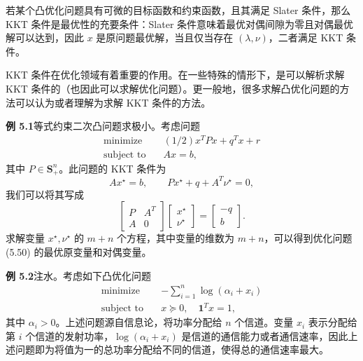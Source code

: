 \documentclass[UTF8, 12pt, fontset=fandol, oneside]{ctexart}
\begin{document}
若某个凸优化问题具有可微的目标函数和约束函数，且其满足 Slater 条件，那么 KKT 条件是最优性的充要条件：Slater 条件意味着最优对偶间隙为零且对偶最优解可以达到，因此 $x$ 是原问题最优解，当且仅当存在 $(\lambda,\nu)$，二者满足 KKT 条件。

KKT 条件在优化领域有着重要的作用。在一些特殊的情形下，是可以解析求解 KKT 条件的（也因此可以求解优化问题）。更一般地，很多求解凸优化问题的方法可以认为或者理解为求解 KKT 条件的方法。

\noindent\textbf{例 5.1}\quad 等式约束二次凸问题求极小。考虑问题
\begin{equation}
\begin{aligned}
\text{minimize}\quad & (1/2)x^TPx+q^Tx+r\\
\text{subject to}\quad & Ax=b,
\end{aligned}
\tag{5.50}
\end{equation}
其中 $P\in\mathbf{S}_+^n$。此问题的 KKT 条件为
\[
Ax^\star=b,\qquad Px^\star+q+A^T\nu^\star=0,
\]
我们可以将其写成
\[
\begin{bmatrix}
P & A^T\\
A & 0
\end{bmatrix}
\begin{bmatrix}
x^\star\\
\nu^\star
\end{bmatrix}
=
\begin{bmatrix}
-q\\
b
\end{bmatrix}.
\]
求解变量 $x^\star,\nu^\star$ 的 $m+n$ 个方程，其中变量的维数为 $m+n$，可以得到优化问题 (5.50) 的最优原变量和对偶变量。

\noindent\textbf{例 5.2}\quad 注水。考虑如下凸优化问题
\[
\begin{aligned}
\text{minimize}\quad & -\sum_{i=1}^n\log(\alpha_i+x_i)\\
\text{subject to}\quad & x\succeq 0,\quad \mathbf{1}^Tx=1,
\end{aligned}
\]
其中 $\alpha_i>0$。上述问题源自信息论，将功率分配给 $n$ 个信道。变量 $x_i$ 表示分配给第 $i$ 个信道的发射功率，$\log(\alpha_i+x_i)$ 是信道的通信能力或者通信速率，因此上述问题即为将值为一的总功率分配给不同的信道，使得总的通信速率最大。
\end{document}
